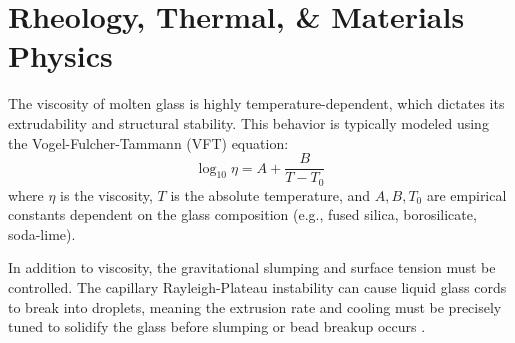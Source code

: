 \section{Rheology, Thermal, \& Materials Physics}
The viscosity of molten glass is highly temperature-dependent, which dictates its extrudability and structural stability. This behavior is typically modeled using the Vogel-Fulcher-Tammann (VFT) equation:
\begin{equation}
\log_{10}\eta = A + \frac{B}{T - T_0}
\end{equation}
where $\eta$ is the viscosity, $T$ is the absolute temperature, and $A, B, T_0$ are empirical constants dependent on the glass composition (e.g., fused silica, borosilicate, soda-lime). 

In addition to viscosity, the gravitational slumping and surface tension must be controlled. The capillary Rayleigh-Plateau instability can cause liquid glass cords to break into droplets, meaning the extrusion rate and cooling must be precisely tuned to solidify the glass before slumping or bead breakup occurs \cite{klein2015additive}.
